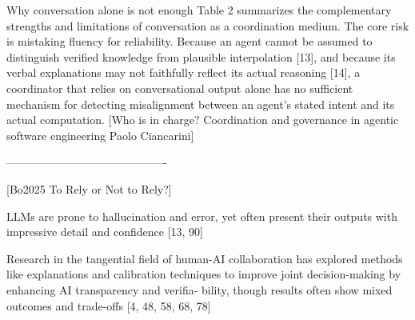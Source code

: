 Why conversation alone is not enough
Table 2 summarizes the complementary strengths and limitations of conversation as a coordination medium.
The core risk is mistaking fluency for reliability. Because an agent cannot be assumed to distinguish verified knowledge from
plausible interpolation [13], and because its verbal explanations may not faithfully reflect its actual reasoning [14], a coordinator
that relies on conversational output alone has no sufficient mechanism for detecting misalignment between an agent’s stated intent
and its actual computation. [Who is in charge? Coordination and governance in agentic
software engineering Paolo Ciancarini]

-------------------------------------------

[Bo2025 To Rely or Not to Rely?]

LLMs are
prone to hallucination and error, yet often present their outputs
with impressive detail and confidence [13, 90]

Research
in the tangential field of human-AI collaboration has explored
methods like explanations and calibration techniques to improve
joint decision-making by enhancing AI transparency and verifia-
bility, though results often show mixed outcomes and trade-offs
[4, 48, 58, 68, 78]








